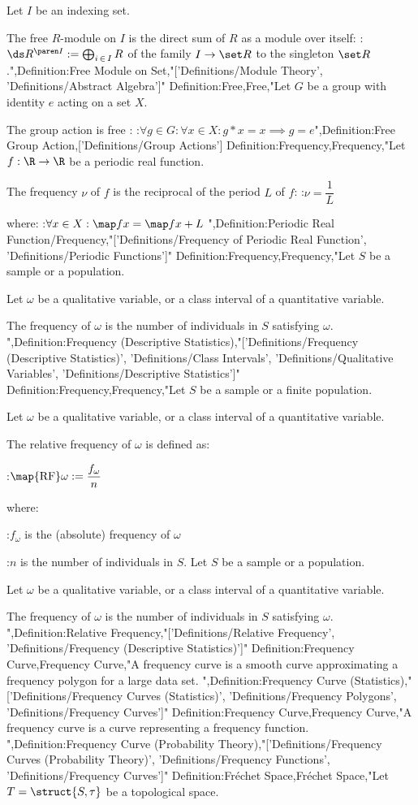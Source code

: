 Let $I$ be an indexing set.


The free $R$-module on $I$ is the direct sum of $R$ as a module over itself:
:$\ds R^{\paren I} := \bigoplus_{i \mathop \in I} R$
of the family $I \to \set R$ to the singleton $\set R$.",Definition:Free Module on Set,"['Definitions/Module Theory', 'Definitions/Abstract Algebra']"
Definition:Free,Free,"Let $G$ be a group with identity $e$ acting on a set $X$.


The group action is free :
:$\forall g \in G: \forall x \in X : g * x = x \implies g = e$",Definition:Free Group Action,['Definitions/Group Actions']
Definition:Frequency,Frequency,"Let $f: \R \to \R$ be a periodic real function.

The frequency $\nu$ of $f$ is the reciprocal of the period $L$ of $f$:
:$\nu = \dfrac 1 L$

where:
:$\forall x \in X: \map f x = \map f {x + L}$
",Definition:Periodic Real Function/Frequency,"['Definitions/Frequency of Periodic Real Function', 'Definitions/Periodic Functions']"
Definition:Frequency,Frequency,"Let $S$ be a sample or a population.

Let $\omega$ be a qualitative variable, or a class interval of a quantitative variable.


The frequency of $\omega$ is the number of individuals in $S$ satisfying $\omega$.
",Definition:Frequency (Descriptive Statistics),"['Definitions/Frequency (Descriptive Statistics)', 'Definitions/Class Intervals', 'Definitions/Qualitative Variables', 'Definitions/Descriptive Statistics']"
Definition:Frequency,Frequency,"Let $S$ be a sample or a finite population.

Let $\omega$ be a qualitative variable, or a class interval of a quantitative variable.


The relative frequency of $\omega$ is defined as:

:$\map {\operatorname {RF} } \omega := \dfrac {f_\omega} n$

where:

:$f_\omega$ is the (absolute) frequency of $\omega$

:$n$ is the number of individuals in $S$.
Let $S$ be a sample or a population.

Let $\omega$ be a qualitative variable, or a class interval of a quantitative variable.


The frequency of $\omega$ is the number of individuals in $S$ satisfying $\omega$.
",Definition:Relative Frequency,"['Definitions/Relative Frequency', 'Definitions/Frequency (Descriptive Statistics)']"
Definition:Frequency Curve,Frequency Curve,"A frequency curve is a smooth curve approximating a frequency polygon for a large data set.
",Definition:Frequency Curve (Statistics),"['Definitions/Frequency Curves (Statistics)', 'Definitions/Frequency Polygons', 'Definitions/Frequency Curves']"
Definition:Frequency Curve,Frequency Curve,"A frequency curve is a curve representing a frequency function.
",Definition:Frequency Curve (Probability Theory),"['Definitions/Frequency Curves (Probability Theory)', 'Definitions/Frequency Functions', 'Definitions/Frequency Curves']"
Definition:Fréchet Space,Fréchet Space,"Let $T = \struct {S, \tau}$ be a topological space.



